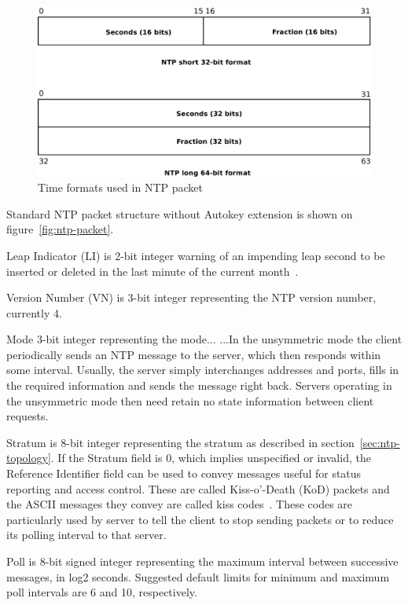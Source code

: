 \begin{figure}
	\centering
	\includegraphics[width=13cm,keepaspectratio]{fig/ntp-timestamps.pdf}
	\caption{Time formats used in NTP packet}
	\label{fig:ntp-timestamps}
	\bigskip
\end{figure}

Standard NTP packet structure without Autokey extension is shown on figure~\ref{fig:ntp-packet}.

Leap Indicator (LI) is 2-bit integer warning of an impending leap
second to be inserted or deleted in the last minute of the current
month~\cite{rfc5905}.

Version Number (VN) is 3-bit integer representing the NTP
version number, currently 4.

Mode 3-bit integer representing the mode...
...In the unsymmetric mode the
      client periodically sends an NTP message to the server, which then
      responds within some interval.  Usually, the server simply
      interchanges addresses and ports, fills in the required
      information and sends the message right back. Servers operating in
      the unsymmetric mode then need retain no state information between
      client requests.

Stratum is 8-bit integer representing the stratum as described in section~\ref{sec:ntp-topology}.
If the Stratum field is 0, which implies unspecified or invalid, the
Reference Identifier field can be used to convey messages useful for
status reporting and access control.
These are called Kiss-o'-Death (KoD)
packets and the ASCII messages they convey are called kiss codes~\cite{rfc5905}.
These codes are particularly used by server to tell the client to stop sending packets or to reduce
its polling interval to that server.

Poll is 8-bit signed integer representing the maximum interval between
successive messages, in log2 seconds.
Suggested default limits for minimum and maximum poll intervals are 6 and 10, respectively.

